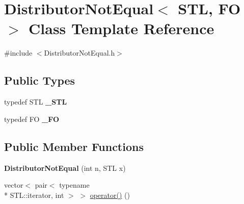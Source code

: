 \hypertarget{class_distributor_not_equal}{\section{Distributor\-Not\-Equal$<$ S\-T\-L, F\-O $>$ Class Template Reference}
\label{class_distributor_not_equal}
}


{\ttfamily \#include $<$Distributor\-Not\-Equal.\-h$>$}

\subsection*{Public Types}
\begin{DoxyCompactItemize}
\item 
\hypertarget{class_distributor_not_equal_a77aeb302823ee6d7454b99a8c86714c8}{typedef S\-T\-L {\bfseries \-\_\-\-S\-T\-L}}\label{class_distributor_not_equal_a77aeb302823ee6d7454b99a8c86714c8}

\item 
\hypertarget{class_distributor_not_equal_a2ae63b2fe0d95db13b075c129ef3e363}{typedef F\-O {\bfseries \-\_\-\-F\-O}}\label{class_distributor_not_equal_a2ae63b2fe0d95db13b075c129ef3e363}

\end{DoxyCompactItemize}
\subsection*{Public Member Functions}
\begin{DoxyCompactItemize}
\item 
\hypertarget{class_distributor_not_equal_a650620f34f9e762999f3b6a1a854af7f}{{\bfseries Distributor\-Not\-Equal} (int n, S\-T\-L x)}\label{class_distributor_not_equal_a650620f34f9e762999f3b6a1a854af7f}

\item 
vector$<$ pair$<$ typename \\*
S\-T\-L\-::iterator, int $>$ $>$ \hyperlink{class_distributor_not_equal_aba3690d4319e46ad5ca33f11012141d0}{operator()} ()
\end{DoxyCompactItemize}
